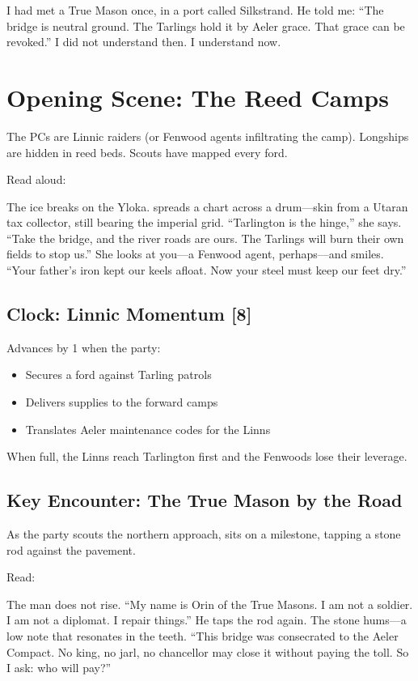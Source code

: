 \documentclass[11pt,a5paper]{book}
\newcommand{\timer}[1]{\textbf{[#1]}}
\begin{document}
I had met a True Mason once, in a port called Silkstrand. He told me: ``The bridge is neutral ground. The Tarlings hold it by Aeler grace. That grace can be revoked.'' I did not understand then. I understand now.

\section*{Opening Scene: The Reed Camps}

The PCs are Linnic raiders (or Fenwood agents infiltrating the camp). Longships are hidden in reed beds. Scouts have mapped every ford.

Read aloud:
\begin{quoting}
The ice breaks on the Yloka. \soren{} spreads a chart across a drum---skin from a Utaran tax collector, still bearing the imperial grid. ``Tarlington is the hinge,'' she says. ``Take the bridge, and the river roads are ours. The Tarlings will burn their own fields to stop us.'' She looks at you---a Fenwood agent, perhaps---and smiles. ``Your father's iron kept our keels afloat. Now your steel must keep our feet dry.''
\end{quoting}

\subsection*{Clock: Linnic Momentum \timer{8}}

Advances by 1 when the party:
\begin{itemize}[leftmargin=*]
\item Secures a ford against Tarling patrols
\item Delivers supplies to the forward camps
\item Translates Aeler maintenance codes for the Linns
\end{itemize}
When full, the Linns reach Tarlington first and the Fenwoods lose their leverage.

\subsection*{Key Encounter: The True Mason by the Road}

As the party scouts the northern approach, \orin{} sits on a milestone, tapping a stone rod against the pavement.

Read:
\begin{quoting}
The man does not rise. ``My name is Orin of the True Masons. I am not a soldier. I am not a diplomat. I repair things.'' He taps the rod again. The stone hums---a low note that resonates in the teeth. ``This bridge was consecrated to the Aeler Compact. No king, no jarl, no chancellor may close it without paying the toll. So I ask: who will pay?''
\end{quoting}
\end{document}
